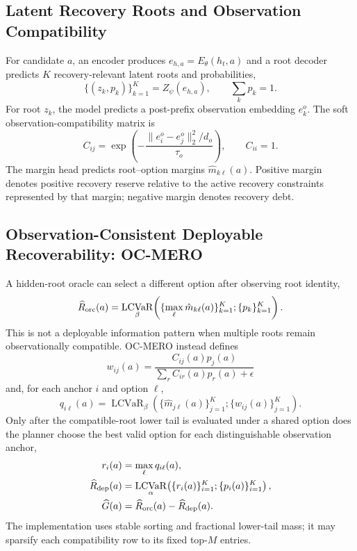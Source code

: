 \documentclass[conference]{IEEEtran}
\DeclareMathOperator{\LCVaR}{LCVaR}
\begin{document}
\subsection{Latent Recovery Roots and Observation Compatibility}
\label{subsec:roots_obs_margin}
For candidate $a$, an encoder produces $e_{h,a}=E_\theta(h_t,a)$ and a root decoder predicts $K$ recovery-relevant latent roots and probabilities,
\begin{equation}
    \{(z_k,p_k)\}_{k=1}^{K}=Z_\psi(e_{h,a}),\qquad \sum_k p_k=1.
    \label{eq:roots}
\end{equation}
For root $z_k$, the model predicts a post-prefix observation embedding $e_k^o$. The soft observation-compatibility matrix is
\begin{equation}
 C_{ij}=\exp\!\left(-\frac{\|e_i^o-e_j^o\|_2^2/d_o}{\tau_o}\right),\qquad C_{ii}=1.
 \label{eq:compatibility}
\end{equation}
The margin head predicts root--option margins $\hat m_{k\ell}(a)$. Positive margin denotes positive recovery reserve relative to the active recovery constraints represented by that margin; negative margin denotes recovery debt.

\subsection{Observation-Consistent Deployable Recoverability: OC-MERO}
\label{subsec:ocmero}
A hidden-root oracle can select a different option after observing root identity,
\begin{equation}
 \widehat R_{\rm orc}(a)=\LCVaR_{\beta}\!\left(
 \{\max_{\ell}\hat m_{k\ell}(a)\}_{k=1}^{K};\{p_k\}_{k=1}^{K}\right).
 \label{eq:oracle_recovery}
\end{equation}
This is not a deployable information pattern when multiple roots remain observationally compatible. OC-MERO instead defines
\begin{equation}
 w_{ij}(a)=\frac{C_{ij}(a)p_j(a)}{\sum_r C_{ir}(a)p_r(a)+\epsilon}
 \label{eq:compat_weights}
\end{equation}
and, for each anchor $i$ and option $\ell$,
\begin{equation}
 q_{i\ell}(a)=\LCVaR_{\beta}\!\left(\{\hat m_{j\ell}(a)\}_{j=1}^{K};\{w_{ij}(a)\}_{j=1}^{K}\right).
 \label{eq:q_shared}
\end{equation}
Only after the compatible-root lower tail is evaluated under a shared option does the planner choose the best valid option for each distinguishable observation anchor,
\begin{align}
 r_i(a)&=\max_{\ell}q_{i\ell}(a),\\
 \widehat R_{\rm dep}(a)&=\LCVaR_{\alpha}\!\left(\{r_i(a)\}_{i=1}^{K};\{p_i(a)\}_{i=1}^{K}\right),
 \label{eq:deployable_recovery}\\
 \widehat G(a)&=\widehat R_{\rm orc}(a)-\widehat R_{\rm dep}(a).
\end{align}
The implementation uses stable sorting and fractional lower-tail mass; it may sparsify each compatibility row to its fixed top-$M$ entries.
\end{document}
